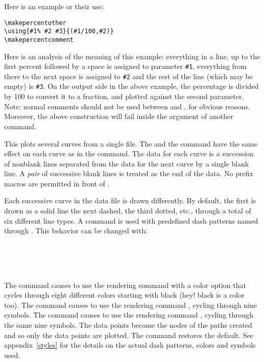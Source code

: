 \documentclass[letterpaper]{article}
\begin{document}
Here is an example or their use:
\begin{verbatim}
\makepercentother
\using{#1% #2 #3}{(#1/100,#2)}
\makepercentcomment
\end{verbatim}

Here is an analysis of the meaning of this example: everything in a
line, up to the first percent followed by a space is assigned to
parameter \texttt{\#1}, everything from there to the next space is
assigned to \texttt{\#2} and the rest of the line (which may be empty)
is \texttt{\#3}. On the output side in the above example, the percentage
is divided by 100 to convert it to a fraction, and plotted against the
second parameter. Note: normal comments should not be used between
 and , for obvious reasons.
Moreover, the above construction will fail inside the argument of
another command.

\begin{cd}
%
\end{cd}

This plots several curves from a single file. The  and the
command  have the same effect on each curve as in the
 command. The data for each curve is a succession of
nonblank lines separated from the data for the next curve by a single
blank line. A \emph{pair} of successive blank lines is treated as the
end of the data. No prefix macros are permitted in front of
.

Each successive curve in the data file is drawn differently. By default,
the first is drawn as a solid line the next dashed, the third dotted,
etc., through a total of six different line types. A 
command is used with predefined dash patterns named 
through . This behavior can be changed with:

\begin{cd}
\\
\\
\\
%
%
%
%
\end{cd}

The command  causes  to use the rendering
command  with a color option that cycles through eight
different colors starting with black (hey! black is a color too). The
command  causes  to use the rendering
command , cycling through nine symbols. The command
 causes  to use the rendering command
, cycling through the same nine symbols. The data points
become the nodes of the paths created and so only the data points are
plotted. The command  restores the default. See
appendix~\ref{styles} for the details on the actual dash patterns,
colors and symbols used.
\end{document}
